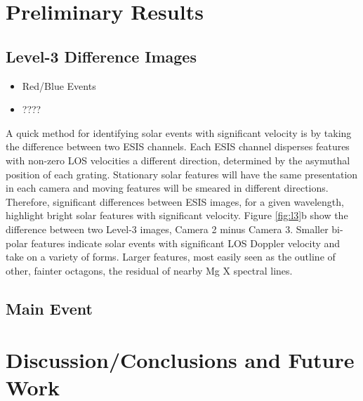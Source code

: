       


\section{Preliminary Results}
    \subsection{Level-3 Difference Images}
        \begin{itemize}
            \item Red/Blue Events
            \item ????
        \end{itemize}
    	A quick method for identifying solar events with significant velocity is by taking the difference between two ESIS channels.
    	Each ESIS channel disperses features with non-zero LOS velocities a different direction, determined by the asymuthal position of each grating. 
    	Stationary solar features will have the same presentation in each camera and moving features will be smeared in different directions.
    	Therefore, significant differences between ESIS images, for a given wavelength, highlight bright solar features with significant velocity.
    	Figure \ref{fig:l3}b show the difference between two Level-3 images, Camera 2 minus Camera 3.
    	Smaller bi-polar features indicate solar events with significant LOS Doppler velocity and take on a variety of forms.
    	Larger features, most easily seen as the outline of other, fainter octagons, the residual of nearby Mg X spectral lines.
    
    \subsection{Main Event}

\section{Discussion/Conclusions and Future Work}



